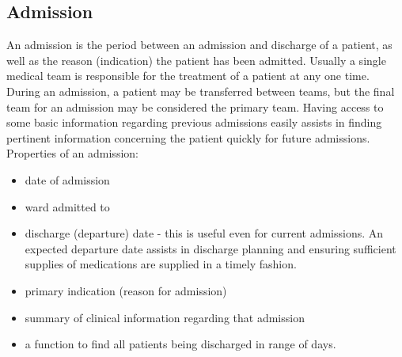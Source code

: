 \documentclass[letterpaper]{amsart}
\begin{document}
\subsection{Admission} An admission is the period between an admission and discharge of a patient, as well as the reason (indication) the patient has been admitted.  Usually a single medical team is responsible for the treatment of a patient at any one time.  During an admission, a patient may be transferred between teams, but the final team for an admission may be considered the primary team.  Having access to some basic information regarding previous admissions easily assists in finding pertinent information concerning the patient quickly for future admissions.   
Properties of an admission:\\
\begin{itemize}
    \item date of admission 
    \item ward admitted to 
    \item discharge (departure) date - this is useful even for current admissions.  An expected departure date assists in discharge planning and ensuring sufficient supplies of medications are supplied in a timely fashion. 
    \item primary indication (reason for admission) 
    \item summary of clinical information regarding that admission 
    \item a function to find all patients being discharged in range of days.
\end{itemize}
\end{document}

